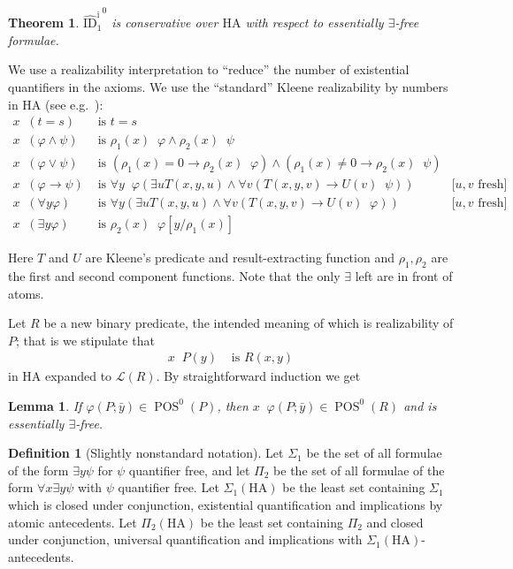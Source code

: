 \documentclass{scrartcl}
\theoremstyle{definition}
\newtheorem{Def}{Definition}
\theoremstyle{plain}
\newtheorem{Lma}{Lemma}
\newtheorem{Thm}{Theorem}
\theoremstyle{remark}
\newcommand{\limp}{\rightarrow}
\renewcommand{\=}{=\!\!\!=}
\renewcommand{\L}{\ensuremath{\mathcal{L}}}
\DeclareMathOperator{\POS}{POS}
\newcommand{\IID}[1]{\ensuremath{\widehat{\mathrm{ID}}_{#1}^{\mathrm{i}}{}}}
\newcommand{\HA}{\ensuremath{\mathrm{HA}}}
\DeclareMathOperator{\rea}{\underbar{r}}
\begin{document}
\begin{Thm}\label{thm:main}
  $\IID1^0$ is conservative over $\HA$ with respect to essentially $\exists$-free formulae.
\end{Thm}

We use a realizability interpretation to ``reduce'' the number of existential quantifiers in the axioms. We use the ``standard'' Kleene realizability by numbers in $\HA$ (see e.g.~\cite{Troelstra_vanDalen:1988}):
\begin{align*}
  x \rea (t = s) &\text{ is } t = s\\
  x \rea (\varphi \land \psi) &\text{ is } \rho_1(x) \rea \varphi \land \rho_2(x) \rea \psi\\
  x \rea (\varphi \lor \psi) &\text{ is } (\rho_1(x) = 0 \limp \rho_2(x) \rea \varphi) \land (\rho_1(x) \not= 0 \limp \rho_2(x) \rea \psi)\\
  x \rea (\varphi \limp \psi) &\text{ is } \forall y \rea \varphi (\exists u T(x,y,u) \land \forall v (T(x,y,v) \limp U(v) \rea \psi)) &\text{[$u,v$ fresh]}\\
  x \rea (\forall y \varphi) &\text{ is } \forall y (\exists u T(x,y,u) \land \forall v (T(x,y,v) \limp U(v) \rea \varphi)) &\text{[$u,v$ fresh]}\\
  x \rea (\exists y \varphi) &\text{ is } \rho_2(x) \rea \varphi[y/\rho_1(x)]
\end{align*}

Here $T$ and $U$ are Kleene's predicate and result-extracting function and $\rho_1,\rho_2$ are the first and second component functions. Note that the only $\exists$ left are in front of atoms.

Let $R$ be a new binary predicate, the intended meaning of which is realizability of $P$; that is we stipulate that
\begin{align*}
  x \rea P(y) &\text{ is } R(x,y)
\end{align*}
in $\HA$ expanded to $\L(R)$. By straightforward induction we get

\begin{Lma}
  If $\varphi(P;\bar{y}) \in \POS^0(P)$, then $x \rea \varphi(P;\bar{y}) \in \POS^0(R)$ and is essentially $\exists$-free.
\end{Lma}

\begin{Def}[Slightly nonstandard notation]
  Let $\Sigma_1$ be the set of all formulae of the form $\exists y \psi$ for $\psi$ quantifier free, and let $\Pi_2$ be the set of all formulae of the form $\forall x \exists y \psi$ with $\psi$ quantifier free. Let $\Sigma_1(\HA)$ be the least set containing $\Sigma_1$ which is closed under conjunction, existential quantification and implications by atomic antecedents. Let $\Pi_2(\HA)$ be the least set containing $\Pi_2$ and closed under conjunction, universal quantification and implications with $\Sigma_1(\HA)$-antecedents.
\end{Def}
\end{document}
